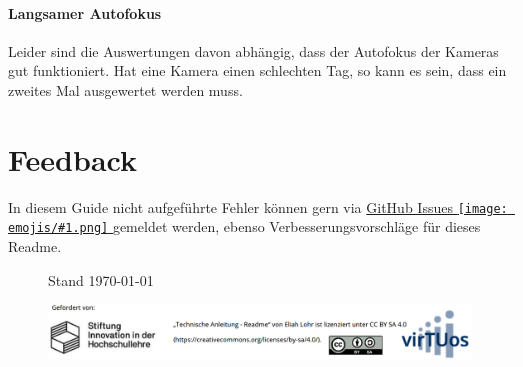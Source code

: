 \documentclass[a4paper, 10pt]{article}
\newcommand{\emoji}[1]{
    \begingroup\normalfont
    \texttt{[image: emojis/\#1.png]}
    \endgroup
}
\begin{document}
\paragraph{Langsamer Autofokus}
Leider sind die Auswertungen davon abhängig, dass der Autofokus der Kameras gut funktioniert. Hat eine Kamera einen schlechten Tag, so kann es sein, dass ein zweites Mal ausgewertet werden muss.

\section{Feedback}
In diesem Guide nicht aufgeführte Fehler können gern via \href{https://github.com/LeLoomi/hybparc_aruco/issues}{GitHub Issues\emoji{link}} gemeldet werden, ebenso Verbesserungsvorschläge für dieses Readme.


\begin{figure}[b]
    \begin{flushleft}
        \hspace*{7.4mm}
        {\footnotesize Stand \today}
    \end{flushleft}
    \vspace{-3.3mm}
    \centering
    \includegraphics[width=14.61cm]{funding+license.png}
\end{figure}
\end{document}
